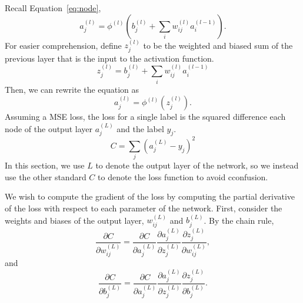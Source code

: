 \documentclass[12pt]{report}
\theoremstyle{definition}
\theoremstyle{remark}
\begin{document}
Recall Equation~\ref{eq:node},
\begin{equation}
    a^{(l)}_j = \phi^{(l)}\left(b_j^{(l)} + \sum_i w_{ij}^{(l)} a_i^{(l-1)}\right).
\end{equation}
For easier comprehension, define $z^{(l)}_j$ to be the weighted and biased sum of the previous layer that is the input to the activation function.
\begin{equation}\label{eq:weighted-sum}
    z^{(l)}_j = b_j^{(l)} + \sum_i w_{ij}^{(l)} a_i^{(l-1)}
\end{equation}
Then, we can rewrite the equation as
\begin{equation}\label{eq:simplified-node}
    a^{(l)}_j = \phi^{(l)}(z_j^{(l)}).
\end{equation}
Assuming a MSE loss, the loss for a single label is the squared difference each node of the output layer $a^{(L)}_j$ and the label $y_j$.
\begin{equation}
    C = \sum_j {(a^{(L)}_j - y_j)}^2
\end{equation}
In this section, we use $L$ to denote the output layer of the network, so we instead use the other standard $C$ to denote the loss function to avoid cconfusion.

We wish to compute the gradient of the loss by computing the partial derivative of the loss with respect to each parameter of the network. First, consider the weights and biases of the output layer, $w_{ij}^{(L)}$ and $b_j^{(L)}$. By the chain rule,
\begin{equation}\label{eq:chain-rule-weights}
    \frac{\partial C}{\partial w_{ij}^{(L)}} = \frac{\partial C}{\partial a_j^{(L)}} \frac{\partial a_j^{(L)}}{\partial z_j^{(L)}} \frac{\partial z_j^{(L)}}{\partial w_{ij}^{(L)}},
\end{equation}
and
\begin{equation}\label{eq:chain-rule-biases}
    \frac{\partial C}{\partial b_j^{(L)}} = \frac{\partial C}{\partial a_j^{(L)}} \frac{\partial a_j^{(L)}}{\partial z_j^{(L)}} \frac{\partial z_j^{(L)}}{\partial b_j^{(L)}}.
\end{equation}
\end{document}
